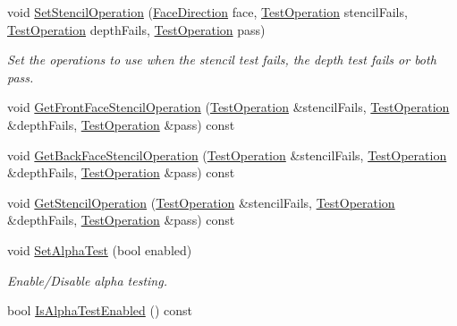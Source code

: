 \begin{DoxyCompactItemize}
\item 
void \hyperlink{class_g_f_w_1_1_context_state_a5715fafc7014e913a4c2ad4b85c0bd8a}{Set\+Stencil\+Operation} (\hyperlink{namespace_g_f_w_a393ef12f1927ff3e7b73b11f72d551eb}{Face\+Direction} face, \hyperlink{namespace_g_f_w_a6a4cd1647d3100386320b711cdda20d4}{Test\+Operation} stencil\+Fails, \hyperlink{namespace_g_f_w_a6a4cd1647d3100386320b711cdda20d4}{Test\+Operation} depth\+Fails, \hyperlink{namespace_g_f_w_a6a4cd1647d3100386320b711cdda20d4}{Test\+Operation} pass)
\begin{DoxyCompactList}\small\item\em Set the operations to use when the stencil test fails, the depth test fails or both pass. \end{DoxyCompactList}\item 
void \hyperlink{class_g_f_w_1_1_context_state_a13f64606832754c2d39b19a1c3444305}{Get\+Front\+Face\+Stencil\+Operation} (\hyperlink{namespace_g_f_w_a6a4cd1647d3100386320b711cdda20d4}{Test\+Operation} \&stencil\+Fails, \hyperlink{namespace_g_f_w_a6a4cd1647d3100386320b711cdda20d4}{Test\+Operation} \&depth\+Fails, \hyperlink{namespace_g_f_w_a6a4cd1647d3100386320b711cdda20d4}{Test\+Operation} \&pass) const
\item 
void \hyperlink{class_g_f_w_1_1_context_state_a4e252d61ca05ed6b5e45520c44495afe}{Get\+Back\+Face\+Stencil\+Operation} (\hyperlink{namespace_g_f_w_a6a4cd1647d3100386320b711cdda20d4}{Test\+Operation} \&stencil\+Fails, \hyperlink{namespace_g_f_w_a6a4cd1647d3100386320b711cdda20d4}{Test\+Operation} \&depth\+Fails, \hyperlink{namespace_g_f_w_a6a4cd1647d3100386320b711cdda20d4}{Test\+Operation} \&pass) const
\item 
void \hyperlink{class_g_f_w_1_1_context_state_a383820958721e83122acd561cebd90f8}{Get\+Stencil\+Operation} (\hyperlink{namespace_g_f_w_a6a4cd1647d3100386320b711cdda20d4}{Test\+Operation} \&stencil\+Fails, \hyperlink{namespace_g_f_w_a6a4cd1647d3100386320b711cdda20d4}{Test\+Operation} \&depth\+Fails, \hyperlink{namespace_g_f_w_a6a4cd1647d3100386320b711cdda20d4}{Test\+Operation} \&pass) const
\item 
void \hyperlink{class_g_f_w_1_1_context_state_a389b0eb730c3e4dfccb2ca8e733c8059}{Set\+Alpha\+Test} (bool enabled)
\begin{DoxyCompactList}\small\item\em Enable/\+Disable alpha testing. \end{DoxyCompactList}\item 
bool \hyperlink{class_g_f_w_1_1_context_state_aa46202064aa37cf14a1db6be93de6ad6}{Is\+Alpha\+Test\+Enabled} () const

\end{DoxyCompactItemize}
